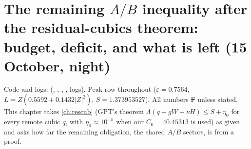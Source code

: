 \section{The remaining $A/B$ inequality after the residual-cubics theorem: budget, deficit, and what is left (15 October, night)}\label{ch:abattack}

Code and logs:  (, , , , logs).
Peak row throughout ($\varepsilon=0.7564$, $L=Z(0.5592+0.1432|Z|^2)$, $S=1.373953527$). All numbers \st{F} unless stated. This chapter takes \autoref{ch:rescub}
(GPT's theorem $\Lambda(q+gW+\nu H)\le S+\eta_0$ for every remote cubic $q$, with $\eta_0\approx10^{-5}$ when our $C_6=40.45313$ is used) as given and asks how far the
remaining obligation, the shared $A/B$ sectors, is from a proof.

